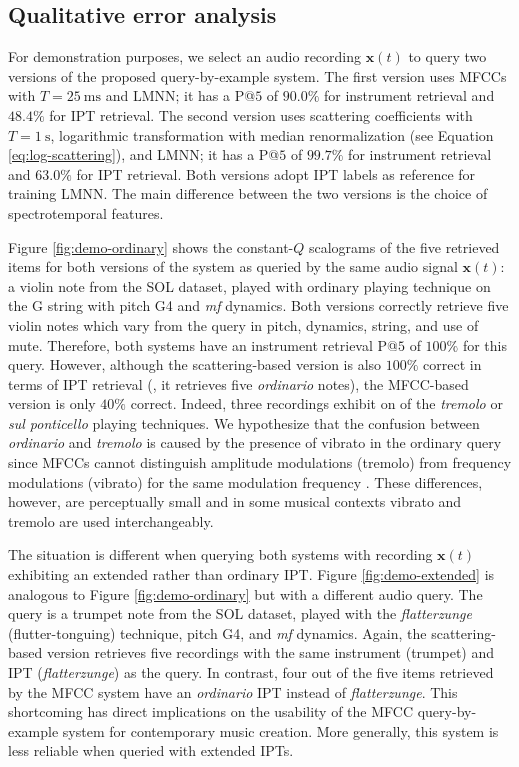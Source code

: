 \subsection{Qualitative error analysis}
For demonstration purposes, we select an audio recording $\boldsymbol{x}(t)$ to query two versions of the proposed query-by-example system.
The first version uses MFCCs with $T=\SI{25}{\milli\second}$ and LMNN; it has a P@$5$ of $90.0\%$ for instrument retrieval and $48.4\%$ for IPT retrieval.
The second version uses scattering coefficients with $T=\SI{1}{\second}$, logarithmic transformation with median renormalization (see Equation \ref{eq:log-scattering}), and LMNN; it has a P@$5$ of $99.7\%$ for instrument retrieval and $63.0\%$ for IPT retrieval.
Both versions adopt IPT labels as reference for training LMNN.
The main difference between the two versions is the choice of spectrotemporal features.

Figure \ref{fig:demo-ordinary} shows the constant-$Q$ scalograms of the five retrieved items for both versions of the system as queried by the same audio signal $\boldsymbol{x}(t)$: a violin note from the SOL dataset, played with ordinary playing technique on the G string with pitch G4 and \emph{mf} dynamics.
Both versions correctly retrieve five violin notes which vary from the query in pitch, dynamics, string, and use of mute.
Therefore, both systems have an instrument retrieval P@$5$ of $100\%$ for this query.
However, although the scattering-based version is also $100\%$ correct in terms of IPT retrieval (\ie{}, it retrieves five \emph{ordinario} notes), the MFCC-based version is only $40\%$ correct.
Indeed, three recordings exhibit on of the \emph{tremolo} or \emph{sul ponticello} playing techniques.
We hypothesize that the confusion between \emph{ordinario} and \emph{tremolo} is caused by the presence of vibrato in the ordinary query since MFCCs cannot distinguish amplitude modulations (tremolo) from frequency modulations (vibrato) for the same modulation frequency \cite{anden2012dafx}.
These differences, however, are perceptually small and in some musical contexts vibrato and tremolo are used interchangeably.

The situation is different when querying both systems with recording $\boldsymbol{x}(t)$ exhibiting an extended rather than ordinary IPT.
Figure \ref{fig:demo-extended} is analogous to Figure \ref{fig:demo-ordinary} but with a different audio query.
The query is a trumpet note from the SOL dataset, played with the \emph{flatterzunge} (flutter-tonguing) technique, pitch G4, and \emph{mf} dynamics.
Again, the scattering-based version retrieves five recordings with the same instrument (trumpet) and IPT (\emph{flatterzunge}) as the query.
In contrast, four out of the five items retrieved by the MFCC system have an \emph{ordinario} IPT instead of \emph{flatterzunge}.
This shortcoming has direct implications on the usability of the MFCC query-by-example system for contemporary music creation.
More generally, this system is less reliable when queried with extended IPTs.

